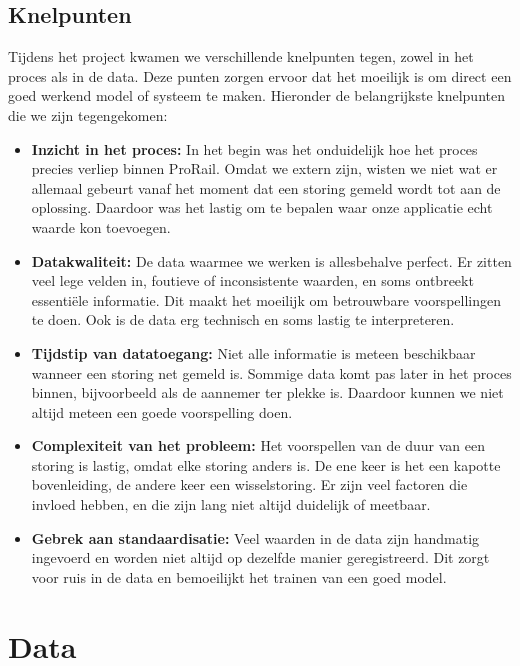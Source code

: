 \documentclass{article}
\begin{document}
\subsection{Knelpunten}
Tijdens het project kwamen we verschillende knelpunten tegen, zowel in het proces als in de data. Deze punten zorgen ervoor dat het moeilijk is om direct een goed werkend model of systeem te maken. Hieronder de belangrijkste knelpunten die we zijn tegengekomen:

\begin{itemize}
  \item \textbf{Inzicht in het proces:} In het begin was het onduidelijk hoe het proces precies verliep binnen ProRail. Omdat we extern zijn, wisten we niet wat er allemaal gebeurt vanaf het moment dat een storing gemeld wordt tot aan de oplossing. Daardoor was het lastig om te bepalen waar onze applicatie echt waarde kon toevoegen.
  \item \textbf{Datakwaliteit:} De data waarmee we werken is allesbehalve perfect. Er zitten veel lege velden in, foutieve of inconsistente waarden, en soms ontbreekt essentiële informatie. Dit maakt het moeilijk om betrouwbare voorspellingen te doen. Ook is de data erg technisch en soms lastig te interpreteren.
  \item \textbf{Tijdstip van datatoegang:} Niet alle informatie is meteen beschikbaar wanneer een storing net gemeld is. Sommige data komt pas later in het proces binnen, bijvoorbeeld als de aannemer ter plekke is. Daardoor kunnen we niet altijd meteen een goede voorspelling doen.
  \item \textbf{Complexiteit van het probleem:} Het voorspellen van de duur van een storing is lastig, omdat elke storing anders is. De ene keer is het een kapotte bovenleiding, de andere keer een wisselstoring. Er zijn veel factoren die invloed hebben, en die zijn lang niet altijd duidelijk of meetbaar.
  \item \textbf{Gebrek aan standaardisatie:} Veel waarden in de data zijn handmatig ingevoerd en worden niet altijd op dezelfde manier geregistreerd. Dit zorgt voor ruis in de data en bemoeilijkt het trainen van een goed model.
\end{itemize}

\newpage
\section{Data}
\end{document}
